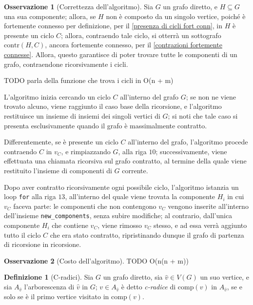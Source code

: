 \documentclass[14pt]{extreport}
\theoremstyle{definition}
\newtheorem{definition}{Definizione}[subsection]
\theoremstyle{definition}
\newtheorem{remark}{Osservazione}[subsection]
\begin{document}
\begin{remark}[Correttezza dell'algoritmo]
    Sia $G$ un grafo diretto, e $H \subseteq G$ una sua componente; allora, se $H$ non è composto da un singolo vertice, poiché è fortemente connesso per definizione, per il \cref{presenza di cicli fort conn}, in $H$ è presente un ciclo $C$; allora, contraendo tale ciclo, si otterrà un sottografo $\mathrm{contr}(H, C)$, ancora fortemente connesso, per il \cref{contrazioni fortemente connesse}. Allora, questo garantisce di poter trovare tutte le componenti di un grafo, contraendone ricorsivamente i cicli.

    TODO parla della funzione che trova i cicli in O(n + m)

    L'algoritmo inizia cercando un ciclo $C$ all'interno del grafo $G$; se non ne viene trovato alcuno, viene raggiunto il caso base della ricorsione, e l'algoritmo restituisce un insieme di insiemi dei singoli vertici di $G$; si noti che tale caso si presenta esclusivamente quando il grafo è massimalmente contratto.

    Differentemente, se è presente un ciclo $C$ all'interno del grafo, l'algoritmo procede contraendo $C$ in $v_C$, e rimpiazzando $G$, alla riga $10$; successivamente, viene effettuata una chiamata ricorsiva sul grafo contratto, al termine della quale viene restituito l'insieme di componenti di $G$ corrente.

    Dopo aver contratto ricorsivamente ogni possibile ciclo, l'algoritmo istanzia un loop \texttt{for} alla riga $13$, all'interno del quale viene trovata la componente $H_i$ in cui $v_C$ faceva parte: le componenti che non contengono $v_C$ vengono inserite all'interno dell'insieme \texttt{new\_components}, senza subire modifiche; al contrario, dall'unica componente $H_i$ che contiene $v_C$, viene rimosso $v_C$ stesso, e ad essa verrà aggiunto tutto il ciclo $C$ che era stato contratto, ripristinando dunque il grafo di partenza di ricorsione in ricorsione.
\end{remark}

\begin{remark}[Costo dell'algoritmo]
    TODO O(n(n + m))
\end{remark}

\begin{definition}[C-radici]
    Sia $G$ un grafo diretto, sia $\hat v \in V(G)$ un suo vertice, e sia $A_{\hat v}$ l'arborescenza di $\hat v$ in $G$; $v \in A_{\hat v}$ è detto \textit{c-radice} di $\mathrm{comp}(v)$ in $A_{\hat v}$, se e solo se è il primo vertice visitato in $\mathrm{comp}(v)$.
\end{definition}
\end{document}
